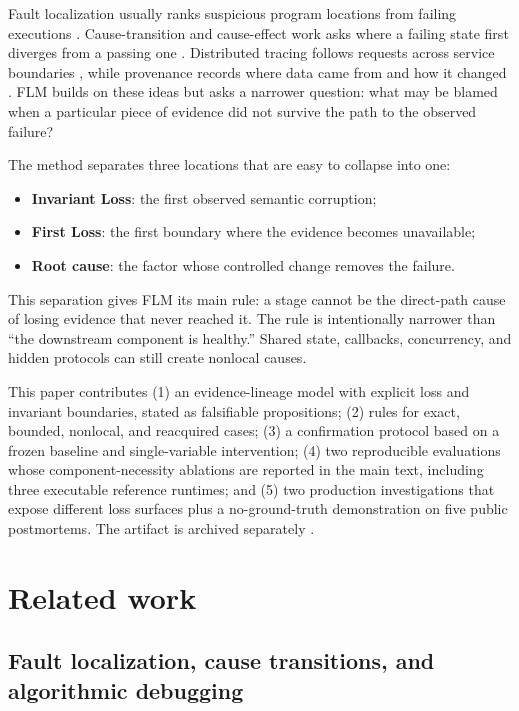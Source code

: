\documentclass[10pt]{article}
\begin{document}
Fault localization usually ranks suspicious program locations from failing executions \cite{jones2002visualization,abreu2009spectrum}. Cause-transition and cause-effect work asks where a failing state first diverges from a passing one \cite{zeller2002causeeffect,cleve2005locating}. Distributed tracing follows requests across service boundaries \cite{sigelman2010dapper,sambasivan2011requestflows}, while provenance records where data came from and how it changed \cite{buneman2001whywhere,cheney2009provenance}. FLM builds on these ideas but asks a narrower question: what may be blamed when a particular piece of evidence did not survive the path to the observed failure?

The method separates three locations that are easy to collapse into one:
\begin{itemize}[leftmargin=*]
  \item \textbf{Invariant Loss}: the first observed semantic corruption;
  \item \textbf{First Loss}: the first boundary where the evidence becomes unavailable;
  \item \textbf{Root cause}: the factor whose controlled change removes the failure.
\end{itemize}
This separation gives FLM its main rule: a stage cannot be the direct-path cause of losing evidence that never reached it. The rule is intentionally narrower than ``the downstream component is healthy.'' Shared state, callbacks, concurrency, and hidden protocols can still create nonlocal causes.

This paper contributes (1) an evidence-lineage model with explicit loss and invariant boundaries, stated as falsifiable propositions; (2) rules for exact, bounded, nonlocal, and reacquired cases; (3) a confirmation protocol based on a frozen baseline and single-variable intervention; (4) two reproducible evaluations whose component-necessity ablations are reported in the main text, including three executable reference runtimes; and (5) two production investigations that expose different loss surfaces plus a no-ground-truth demonstration on five public postmortems. The artifact is archived separately \cite{chen2026firstlossartifact}.

\section{Related work}

\subsection{Fault localization, cause transitions, and algorithmic debugging}
\end{document}
